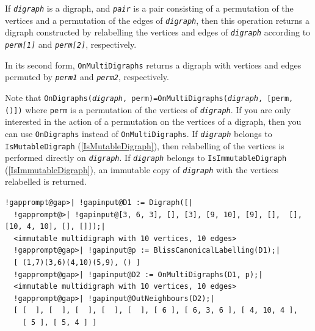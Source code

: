 \documentclass[a4paper,11pt]{report}
\begin{document}
{{{ If \mbox{\texttt{\mdseries\slshape digraph}} is a digraph, and \mbox{\texttt{\mdseries\slshape pair}} is a pair consisting of a permutation of the vertices and a permutation of the
edges of \mbox{\texttt{\mdseries\slshape digraph}}, then this operation returns a digraph constructed by relabelling the
vertices and edges of \mbox{\texttt{\mdseries\slshape digraph}} according to \mbox{\texttt{\mdseries\slshape perm[1]}} and \mbox{\texttt{\mdseries\slshape perm[2]}}, respectively. 

 In its second form, \texttt{OnMultiDigraphs} returns a digraph with vertices and edges permuted by \mbox{\texttt{\mdseries\slshape perm1}} and \mbox{\texttt{\mdseries\slshape perm2}}, respectively. 

 Note that \texttt{OnDigraphs(\mbox{\texttt{\mdseries\slshape digraph}}, perm)=OnMultiDigraphs(\mbox{\texttt{\mdseries\slshape digraph}}, [perm, ()])} where \texttt{perm} is a permutation of the vertices of \mbox{\texttt{\mdseries\slshape digraph}}. If you are only interested in the action of a permutation on the vertices of
a digraph, then you can use \texttt{OnDigraphs} instead of \texttt{OnMultiDigraphs}. If \mbox{\texttt{\mdseries\slshape digraph}} belongs to \texttt{IsMutableDigraph} (\ref{IsMutableDigraph}), then relabelling of the vertices is performed directly on \mbox{\texttt{\mdseries\slshape digraph}}. If \mbox{\texttt{\mdseries\slshape digraph}} belongs to \texttt{IsImmutableDigraph} (\ref{IsImmutableDigraph}), an immutable copy of \mbox{\texttt{\mdseries\slshape digraph}} with the vertices relabelled is returned.

 
\begin{Verbatim}[commandchars=!@|,fontsize=\small,frame=single,label=Example]
  !gapprompt@gap>| !gapinput@D1 := Digraph([|
  !gapprompt@>| !gapinput@[3, 6, 3], [], [3], [9, 10], [9], [],  [], [10, 4, 10], [], []]);|
  <immutable multidigraph with 10 vertices, 10 edges>
  !gapprompt@gap>| !gapinput@p := BlissCanonicalLabelling(D1);|
  [ (1,7)(3,6)(4,10)(5,9), () ]
  !gapprompt@gap>| !gapinput@D2 := OnMultiDigraphs(D1, p);|
  <immutable multidigraph with 10 vertices, 10 edges>
  !gapprompt@gap>| !gapinput@OutNeighbours(D2);|
  [ [  ], [  ], [  ], [  ], [  ], [ 6 ], [ 6, 3, 6 ], [ 4, 10, 4 ], 
    [ 5 ], [ 5, 4 ] ]
\end{Verbatim}
 }

 

}}
\end{document}
